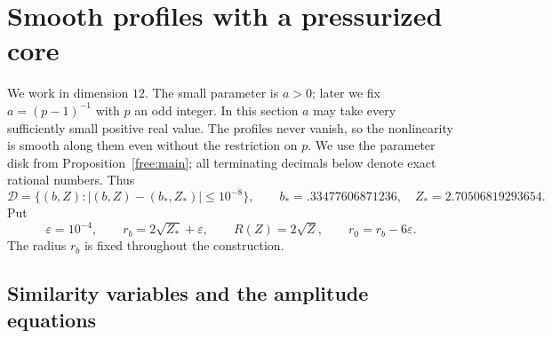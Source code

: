\section{Smooth profiles with a pressurized core}\label{sec:profiles}

We work in dimension $12$.  The small parameter is $a>0$; later we fix
$a=(p-1)^{-1}$ with $p$ an odd integer.  In this section $a$ may take every
sufficiently small positive real value.  The profiles never vanish, so the
nonlinearity is smooth along them even without the restriction on $p$.
We use the parameter disk from Proposition~\ref{free:main}; all
terminating decimals below denote exact rational numbers.  Thus
\[
 \mathcal D=\{(b,Z):|(b,Z)-(b_*,Z_*)|\le10^{-8}\},\qquad
 b_*=.33477606871236,\quad Z_*=2.70506819293654.
\]
Put
\begin{equation}\label{profile:radii}
 \varepsilon=10^{-4},\qquad r_b=2\sqrt{Z_*}+\varepsilon,
 \qquad R(Z)=2\sqrt Z,\qquad r_0=r_b-6\varepsilon.
\end{equation}
The radius $r_b$ is fixed throughout the construction.

\subsection{Similarity variables and the amplitude equations}

